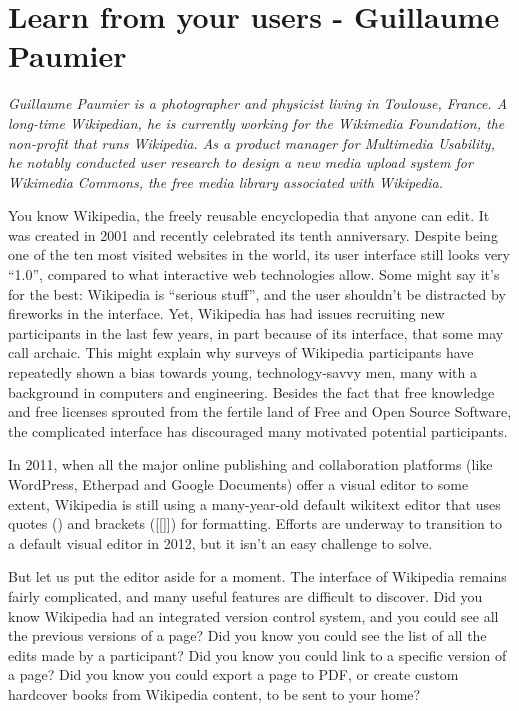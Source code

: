 \chapter{Learn from your users - Guillaume Paumier}

\textit{Guillaume Paumier is a photographer and physicist living in Toulouse,
France. A long-time Wikipedian, he is currently working for the Wikimedia
Foundation, the non-profit that runs Wikipedia. As a product manager for
Multimedia Usability, he notably conducted user research to design a new media
upload system for Wikimedia Commons, the free media library associated with
Wikipedia.}

You know Wikipedia, the freely reusable encyclopedia that anyone can edit. It
was created in 2001 and recently celebrated its tenth anniversary. Despite being
one of the ten most visited websites in the world, its user interface still
looks very ``1.0'', compared to what interactive web technologies allow. Some
might say it's for the best: Wikipedia is ``serious stuff'', and the user
shouldn't be distracted by fireworks in the interface. Yet, Wikipedia has had
issues recruiting new participants in the last few years, in part because of its
interface, that some may call archaic. This might explain why surveys of
Wikipedia participants have repeatedly shown a bias towards young,
technology-savvy men, many with a background in computers and engineering.
Besides the fact that free knowledge and free licenses sprouted from the fertile
land of Free and Open Source Software, the complicated interface has discouraged
many motivated potential participants.

In 2011, when all the major online publishing and collaboration platforms (like
WordPress, Etherpad and Google Documents) offer a visual editor to some extent,
Wikipedia is still using a many-year-old default wikitext editor that uses
quotes (\textquotesingle \textquotesingle \textquotesingle \textquotesingle) and
brackets ([[]]) for formatting. Efforts are underway to transition to a default
visual editor in 2012, but it isn't an easy challenge to solve.

But let us put the editor aside for a moment. The interface of Wikipedia remains
fairly complicated, and many useful features are difficult to discover. Did you
know Wikipedia had an integrated version control system, and you could see all
the previous versions of a page? Did you know you could see the list of all the
edits made by a participant? Did you know you could link to a specific version
of a page? Did you know you could export a page to PDF, or create custom
hardcover books from Wikipedia content, to be sent to your home?

